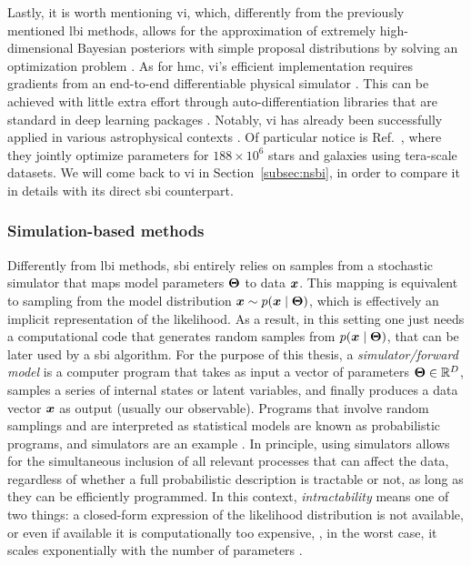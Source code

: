 Lastly, it is worth mentioning \gls*{vi}, which, differently from the previously mentioned \gls*{lbi} methods, allows for the approximation of extremely high-dimensional Bayesian posteriors with simple proposal distributions by solving an optimization problem \cite{hoffman2013stochastic, zhang2018advances}. As for \gls*{hmc}, \gls*{vi}'s efficient implementation requires gradients from an end-to-end differentiable physical simulator \cite[\eg][]{caustic, Morvan_2021, sstrax}. This can be achieved with little extra effort through auto-differentiation libraries that are standard in deep learning packages \cite[\eg][]{pytorch, jax2018github}. Notably, \gls*{vi} has already been successfully applied in various astrophysical contexts \cite{regier2019cataloging, liu2023variational, Mishra-Sharma:2020kjb, Karchev:2021fro, leike2020resolving}. Of particular notice is Ref.~\cite{regier2019cataloging}, where they jointly optimize parameters for $188\times 10^6$ stars and galaxies using tera-scale datasets. We will come back to \gls*{vi} in Section~\ref{subsec:nsbi}, in order to compare it in details with its direct \gls*{sbi} counterpart. 

\vspace{0.2cm}
\subsubsection{Simulation-based methods}

Differently from \gls*{lbi} methods, \gls*{sbi} entirely relies on samples from a stochastic simulator that maps model parameters $\bm{\Theta}$ to data $\bm{x}$. This mapping is equivalent to sampling from the model distribution $\bm{x} \sim p(\bm{x}\mid\bm{\Theta})$, which is effectively an implicit representation of the likelihood. As a result, in this setting one just needs a computational code that generates random samples from $p(\bm{x}\mid\bm{\Theta})$, that can be later used by a \gls*{sbi} algorithm. For the purpose of this thesis, a \emph{simulator/forward model} is a computer program that takes as input a vector of parameters $\bm{\Theta} \in \mathbb{R}^D$, samples a series of internal states or latent variables, and finally produces a data vector  $\bm{x}$  as output (usually our observable). Programs that involve random samplings and are interpreted as statistical models are known as probabilistic programs, and simulators are an example \cite{Cranmer:2019eaq}. In principle, using simulators allows for the simultaneous inclusion of all relevant processes that can affect the data, regardless of whether a full probabilistic description is tractable or not, as long as they can be efficiently programmed. In this context, \emph{intractability} means one of two things: a closed-form expression of the likelihood distribution is not available, or even if available it is computationally too expensive, \eg, in the worst case, it scales exponentially with the number of parameters \cite{Leclercq:2018who, Mootoovaloo:2020ott}.

